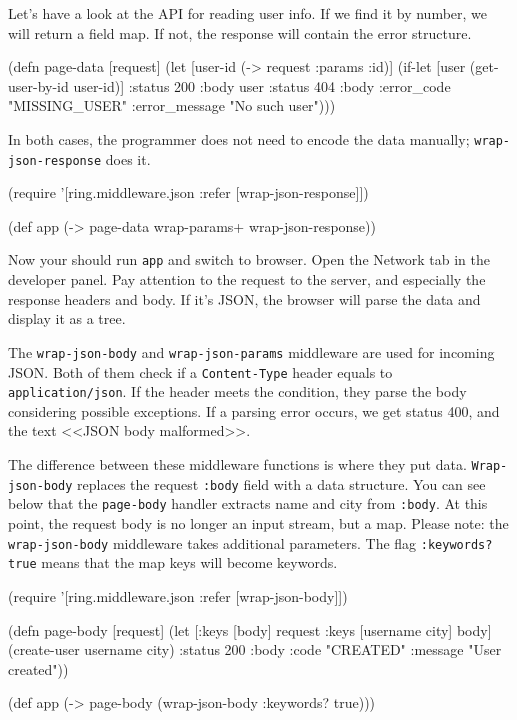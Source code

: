 Let's have a look at the API for reading user info. If we find it by number, we will return a field map. If not, the response will contain the error structure.

\begin{english}
\begin{clojure}
(defn page-data [request]
(let [user-id (-> request :params :id)]
(if-let [user (get-user-by-id user-id)]
{:status 200 :body user}
{:status 404
:body {:error_code "MISSING_USER"
:error_message "No such user"}})))
\end{clojure}
\end{english}

\noindent In both cases, the programmer does not need to encode the data manually; \verb|wrap-json-response| does it.

\begin{english}
\begin{clojure}
(require '[ring.middleware.json
:refer [wrap-json-response]])

(def app (-> page-data
wrap-params+
wrap-json-response))
\end{clojure}
\end{english}

Now your should run \verb|app| and switch to browser. Open the Network tab in the developer panel. Pay attention to the request to the server, and especially the response headers and body. If it's JSON, the browser will parse the data and display it as a tree.

The \verb|wrap-json-body| and \verb|wrap-json-params| middleware are used for incoming JSON. Both of them check if a \verb|Content-Type| header equals to \verb|application/json|. If the header meets the condition, they parse the body considering possible exceptions. If a parsing error occurs, we get status 400, and the text <<JSON body malformed>>.

The difference between these middleware functions is where they put data. \verb|Wrap-json-body| replaces the request \verb|:body| field with a data structure. You can see below that the \verb|page-body| handler extracts name and city from \verb|:body|. At this point, the request body is no longer an input stream, but a map. Please note: the \verb|wrap-json-body| middleware takes additional parameters. The flag \verb|:keywords? true| means that the map keys will become keywords.

\begin{english}
\begin{clojure}
(require '[ring.middleware.json :refer [wrap-json-body]])

(defn page-body [request]
(let [{:keys [body]} request
{:keys [username city]} body]
(create-user username city)
{:status 200
:body {:code "CREATED"
:message "User created"}}))

(def app (-> page-body
(wrap-json-body {:keywords? true})))
\end{clojure}
\end{english}

